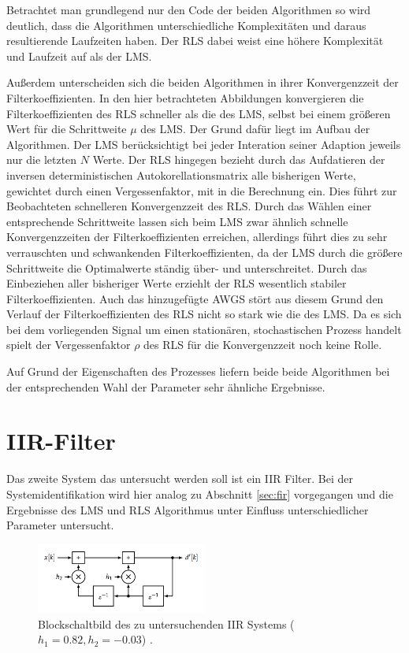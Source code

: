 Betrachtet man grundlegend nur den Code der beiden Algorithmen so wird deutlich, dass die Algorithmen unterschiedliche Komplexitäten und daraus resultierende Laufzeiten haben.
Der RLS dabei weist eine höhere Komplexität und Laufzeit auf als der LMS.

Außerdem unterscheiden sich die beiden Algorithmen in ihrer Konvergenzzeit der Filterkoeffizienten.
In den hier betrachteten Abbildungen konvergieren die Filterkoeffizienten des RLS schneller als die des LMS, selbst bei einem größeren Wert für die Schrittweite $\mu$ des LMS.
Der Grund dafür liegt im Aufbau der Algorithmen.
Der LMS berücksichtigt bei jeder Interation seiner Adaption jeweils nur die letzten $N$ Werte.
Der RLS hingegen bezieht durch das Aufdatieren der inversen deterministischen Autokorellationsmatrix alle bisherigen Werte, gewichtet durch einen Vergessenfaktor, mit in die Berechnung ein.
Dies führt zur Beobachteten schnelleren Konvergenzzeit des RLS.
Durch das Wählen einer entsprechende Schrittweite lassen sich beim LMS zwar ähnlich schnelle Konvergenzzeiten der Filterkoeffizienten erreichen, allerdings führt dies zu sehr verrauschten und schwankenden Filterkoeffizienten, da der LMS durch die größere Schrittweite die Optimalwerte ständig über- und unterschreitet.
Durch das Einbeziehen aller bisheriger Werte erziehlt der RLS wesentlich stabiler Filterkoeffizienten.
Auch das hinzugefügte AWGS stört aus diesem Grund den Verlauf der Filterkoeffizienten des RLS nicht so stark wie die des LMS.
Da es sich bei dem vorliegenden Signal um einen stationären, stochastischen Prozess handelt spielt der Vergessenfaktor $\rho$ des RLS für die Konvergenzzeit noch keine Rolle.

Auf Grund der Eigenschaften des Prozesses liefern beide beide Algorithmen bei der entsprechenden Wahl der Parameter sehr ähnliche Ergebnisse.







\section{IIR-Filter}
\label{sec:iir}

Das zweite System das untersucht werden soll ist ein IIR Filter.
Bei der Systemidentifikation wird hier analog zu Abschnitt \ref{sec:fir} vorgegangen und die Ergebnisse des LMS und RLS Algorithmus unter Einfluss unterschiedlicher Parameter untersucht.

\begin{figure}[H]
  \centering
      \includegraphics[width=0.5\textwidth]{figures/IIR_System.png}
 \caption{Blockschaltbild des zu untersuchenden IIR Systems ($h_1 = 0.82, h_2 = -0.03$) \cite{aufgabenstellung}.}
	\label{fig:IIR_System}
\end{figure}



